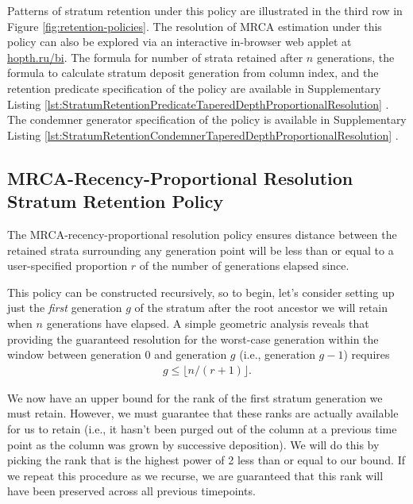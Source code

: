 Patterns of stratum retention under this policy are illustrated in the third row in Figure \ref{fig:retention-policies}.
The resolution of MRCA estimation under this policy can also be explored via an interactive in-browser web applet at \url{hopth.ru/bi}.
The formula for number of strata retained after $n$ generations, the formula to calculate stratum deposit generation from column index, and the retention predicate specification of the policy are available in Supplementary Listing \ref{lst:StratumRetentionPredicateTaperedDepthProportionalResolution} \citep{moreno2022hstratconceptsupplement}.
The condemner generator specification of the policy is available in Supplementary Listing \ref{lst:StratumRetentionCondemnerTaperedDepthProportionalResolution} \citep{moreno2022hstratconceptsupplement}.

\subsection{MRCA-Recency-Proportional Resolution Stratum Retention Policy}



The MRCA-recency-proportional resolution policy ensures distance between the retained strata surrounding any generation point will be less than or equal to a user-specified proportion $r$ of the number of generations elapsed since.

This policy can be constructed recursively, so to begin, let's consider setting up just the \textit{first} generation $g$ of the stratum after the root ancestor we will retain when $n$ generations have elapsed.
A simple geometric analysis reveals that providing the guaranteed resolution for the worst-case generation within the window between generation 0 and generation $g$ (i.e., generation $g-1$) requires
\begin{align*}
  g \leq \lfloor n / (r + 1) \rfloor.
\end{align*}

We now have an upper bound for the rank of the first stratum generation
we must retain.
However, we must guarantee that these ranks are actually available for us to retain (i.e., it hasn't been purged out of the column at a previous time point as the column was grown by successive deposition).
We will do this by picking the rank that is the highest power of 2 less than or equal to our bound.
If we repeat this procedure as we recurse, we are guaranteed that this rank will have been preserved across all previous timepoints.

